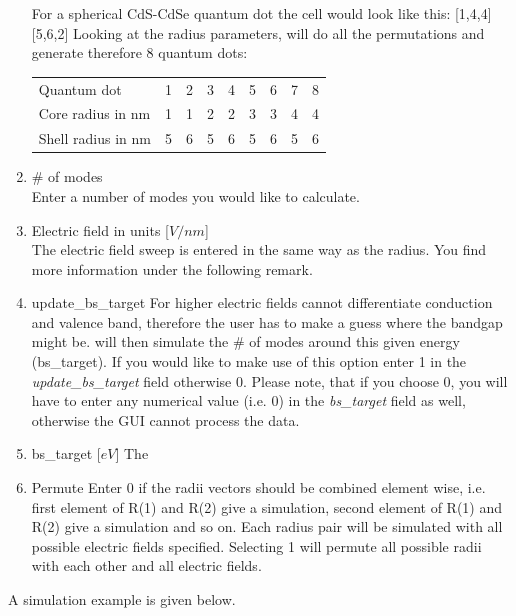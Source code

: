 \begin{enumerate}
							\begin{EXAMPLE}
								For a spherical CdS-CdSe quantum dot the cell would look like this: [1,4,4][5,6,2]
								Looking at the radius parameters, \software will do all the permutations and generate therefore 8 quantum dots: \\
								\newline
								\begin{tabular}{@{}lcccccccc}
									Quantum dot					&	1	&	2	&	3	&	4 &	5	&	6	& 7	&	8	\\
									Core radius	in nm		&	1	& 1 & 2 & 2 & 3	& 3 & 4 & 4	\\
									Shell radius in nm	& 5	& 6 & 5 & 6 & 5 & 6 & 5 & 6	\\
								\end{tabular}
							\end{EXAMPLE}
				\item \# of modes	\\
							Enter a number of modes you would like to calculate.
				\item Electric field in units [$V/nm$]			\\
							The electric field sweep is entered in the same way as the radius. You find more information under the following remark.
				\item update\_bs\_target
							For higher electric fields \omen cannot differentiate conduction and valence band, therefore the user has to make a guess
							where the bandgap might be. \omen will then simulate the \# of modes around this given energy (bs\_target).
							If you would like to make use of this option enter 1 in the {\it update\_bs\_target} field otherwise 0.
							Please note, that if you choose 0, you will have to enter any numerical value (i.e. 0) in the {\it bs\_target} field as well, otherwise
							the \gls{GUI} cannot process the data.
				\item bs\_target [$eV$]
							The 
				\item Permute
							Enter 0 if the radii vectors should be combined element wise, i.e. first element of R(1) and R(2) give a simulation, second element
							of R(1) and R(2) give a simulation and so on. Each radius pair will be simulated with all possible electric fields specified.
							Selecting 1 will permute all possible radii with each other and all electric fields.
			\end{enumerate}
			
			A simulation example is given below.
			
